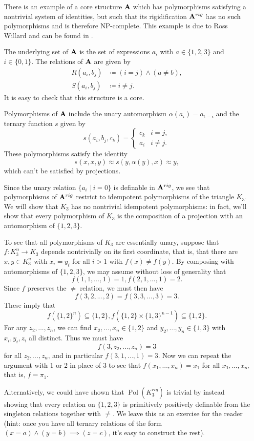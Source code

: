 \documentclass[letterpaper,11pt]{article}
\DeclareMathOperator{\Pol}{Pol}
\begin{document}
\begin{ex} There is an example of a core structure $\mathbf{A}$ which has polymorphisms satisfying a nontrivial system of identities, but such that its rigidification $\mathbf{A}^{rig}$ has no such polymorphisms and is therefore NP-complete. This example is due to Ross Willard and can be found in \cite{topology-irrelevant}.

The underlying set of $\mathbf{A}$ is the set of expressions $a_i$ with $a \in \{1,2,3\}$ and $i \in \{0,1\}$. The relations of $\mathbf{A}$ are given by
\begin{align*}
R(a_i,b_j) &\coloneqq (i = j) \wedge (a \ne b),\\
S(a_i,b_j) &\coloneqq i \ne j.
\end{align*}
It is easy to check that this structure is a core.

Polymorphisms of $\mathbf{A}$ include the unary automorphism $\alpha(a_i) = a_{1-i}$ and the ternary function $s$ given by
\[
s(a_i,b_j,c_k) = \begin{cases}c_k & i = j,\\ a_i & i \ne j.\end{cases}
\]
These polymorphisms satisfy the identity
\[
s(x,x,y) \approx s(y,\alpha(y),x) \approx y,
\]
which can't be satisfied by projections.

Since the unary relation $\{a_i \mid i = 0\}$ is definable in $\mathbf{A}^{rig}$, we see that polymorphisms of $\mathbf{A}^{rig}$ restrict to idempotent polymorphisms of the triangle $K_3$. We will show that $K_3$ has no nontrivial idempotent polymorphisms: in fact, we'll show that every polymorphism of $K_3$ is the composition of a projection with an automorphism of $\{1,2,3\}$.

To see that all polymorphisms of $K_3$ are essentially unary, suppose that $f : K_3^n \rightarrow K_3$ depends nontrivially on its first coordinate, that is, that there are $x,y \in K_3^n$ with $x_i = y_i$ for all $i > 1$ with $f(x) \ne f(y)$. By composing with automorphisms of $\{1,2,3\}$, we may assume without loss of generality that
\[
f(1,1,...,1) = 1, f(2,1,...,1) = 2.
\]
Since $f$ preserves the $\ne$ relation, we must then have
\[
f(3,2,...,2) = f(3,3,...,3) = 3.
\]
These imply that
\[
f(\{1,2\}^n) \subseteq \{1,2\}, f(\{1,2\}\times \{1,3\}^{n-1}) \subseteq \{1,2\}.
\]
For any $z_2, ..., z_n$, we can find $x_2, ..., x_n \in \{1,2\}$ and $y_2, ..., y_n \in \{1,3\}$ with $x_i,y_i,z_i$ all distinct. Thus we must have
\[
f(3,z_2, ..., z_n) = 3
\]
for all $z_2, ..., z_n$, and in particular $f(3,1,...,1) = 3$. Now we can repeat the argument with $1$ or $2$ in place of $3$ to see that $f(x_1, ..., x_n) = x_1$ for all $x_1, ..., x_n$, that is, $f = \pi_1$.

Alternatively, we could have shown that $\Pol(K_3^{rig})$ is trivial by instead showing that every relation on $\{1,2,3\}$ is primitively positively definable from the singleton relations together with $\ne$. We leave this as an exercise for the reader (hint: once you have all ternary relations of the form $(x=a)\wedge(y=b) \implies (z=c)$, it's easy to construct the rest).
\end{ex}
\end{document}
